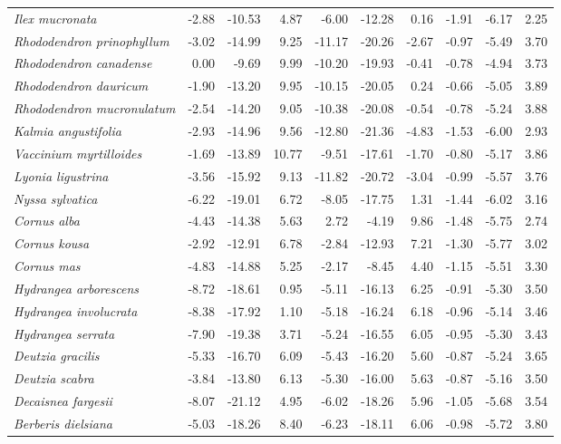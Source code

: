 \documentclass[11pt]{article}
\begin{document}
\begin{longtable}{lrrrrrrrrr}
  \emph{Ilex mucronata} & -2.88 & -10.53 & 4.87 & -6.00 & -12.28 & 0.16 & -1.91 & -6.17 & 2.25 \\ 
  \emph{Rhododendron prinophyllum} & -3.02 & -14.99 & 9.25 & -11.17 & -20.26 & -2.67 & -0.97 & -5.49 & 3.70 \\ 
  \emph{Rhododendron canadense} & 0.00 & -9.69 & 9.99 & -10.20 & -19.93 & -0.41 & -0.78 & -4.94 & 3.73 \\ 
  \emph{Rhododendron dauricum} & -1.90 & -13.20 & 9.95 & -10.15 & -20.05 & 0.24 & -0.66 & -5.05 & 3.89 \\ 
  \emph{Rhododendron mucronulatum} & -2.54 & -14.20 & 9.05 & -10.38 & -20.08 & -0.54 & -0.78 & -5.24 & 3.88 \\ 
  \emph{Kalmia angustifolia} & -2.93 & -14.96 & 9.56 & -12.80 & -21.36 & -4.83 & -1.53 & -6.00 & 2.93 \\ 
  \emph{Vaccinium myrtilloides} & -1.69 & -13.89 & 10.77 & -9.51 & -17.61 & -1.70 & -0.80 & -5.17 & 3.86 \\ 
  \emph{Lyonia ligustrina} & -3.56 & -15.92 & 9.13 & -11.82 & -20.72 & -3.04 & -0.99 & -5.57 & 3.76 \\ 
  \emph{Nyssa sylvatica} & -6.22 & -19.01 & 6.72 & -8.05 & -17.75 & 1.31 & -1.44 & -6.02 & 3.16 \\ 
  \emph{Cornus alba} & -4.43 & -14.38 & 5.63 & 2.72 & -4.19 & 9.86 & -1.48 & -5.75 & 2.74 \\ 
  \emph{Cornus kousa} & -2.92 & -12.91 & 6.78 & -2.84 & -12.93 & 7.21 & -1.30 & -5.77 & 3.02 \\ 
  \emph{Cornus mas} & -4.83 & -14.88 & 5.25 & -2.17 & -8.45 & 4.40 & -1.15 & -5.51 & 3.30 \\ 
  \emph{Hydrangea arborescens} & -8.72 & -18.61 & 0.95 & -5.11 & -16.13 & 6.25 & -0.91 & -5.30 & 3.50 \\ 
  \emph{Hydrangea involucrata} & -8.38 & -17.92 & 1.10 & -5.18 & -16.24 & 6.18 & -0.96 & -5.14 & 3.46 \\ 
  \emph{Hydrangea serrata} & -7.90 & -19.38 & 3.71 & -5.24 & -16.55 & 6.05 & -0.95 & -5.30 & 3.43 \\ 
  \emph{Deutzia gracilis} & -5.33 & -16.70 & 6.09 & -5.43 & -16.20 & 5.60 & -0.87 & -5.24 & 3.65 \\ 
  \emph{Deutzia scabra} & -3.84 & -13.80 & 6.13 & -5.30 & -16.00 & 5.63 & -0.87 & -5.16 & 3.50 \\ 
  \emph{Decaisnea fargesii} & -8.07 & -21.12 & 4.95 & -6.02 & -18.26 & 5.96 & -1.05 & -5.68 & 3.54 \\ 
  \emph{Berberis dielsiana} & -5.03 & -18.26 & 8.40 & -6.23 & -18.11 & 6.06 & -0.98 & -5.72 & 3.80 \\ 

\end{longtable}
\end{document}
